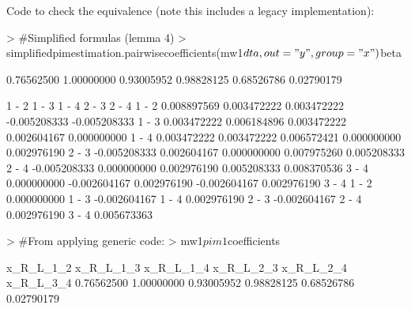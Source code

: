\documentclass[12pt]{article}
\begin{document}
Code to check the equivalence (note this includes a legacy implementation):
\begin{Schunk}
\begin{Sinput}
> 	#Simplified formulas (lemma 4)
> 	simplifiedpimestimation.pairwisecoefficients(mw1$dta, out="y", group="x")$beta
\end{Sinput}
\begin{Soutput}
[1] 0.76562500 1.00000000 0.93005952 0.98828125 0.68526786 0.02790179
\end{Soutput}
\begin{Soutput}
             1 - 2        1 - 3       1 - 4        2 - 3        2 - 4
1 - 2  0.008897569  0.003472222 0.003472222 -0.005208333 -0.005208333
1 - 3  0.003472222  0.006184896 0.003472222  0.002604167  0.000000000
1 - 4  0.003472222  0.003472222 0.006572421  0.000000000  0.002976190
2 - 3 -0.005208333  0.002604167 0.000000000  0.007975260  0.005208333
2 - 4 -0.005208333  0.000000000 0.002976190  0.005208333  0.008370536
3 - 4  0.000000000 -0.002604167 0.002976190 -0.002604167  0.002976190
             3 - 4
1 - 2  0.000000000
1 - 3 -0.002604167
1 - 4  0.002976190
2 - 3 -0.002604167
2 - 4  0.002976190
3 - 4  0.005673363
\end{Soutput}
\begin{Sinput}
> 	#From applying generic code:
> 	mw1$pim1$coefficients
\end{Sinput}
\begin{Soutput}
 x_R_L_1_2  x_R_L_1_3  x_R_L_1_4  x_R_L_2_3  x_R_L_2_4  x_R_L_3_4 
0.76562500 1.00000000 0.93005952 0.98828125 0.68526786 0.02790179 
\end{Soutput}

\end{Schunk}
\end{document}
